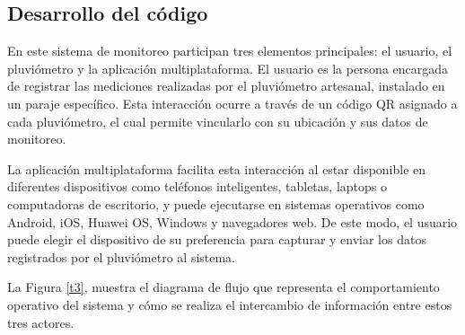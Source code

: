 




































































\subsection{Desarrollo del código}

En este sistema de monitoreo participan tres elementos principales: el usuario, el pluviómetro y la aplicación multiplataforma. El usuario es la persona encargada de registrar las mediciones realizadas por el pluviómetro artesanal, instalado en un paraje específico. Esta interacción ocurre a través de un código QR asignado a cada pluviómetro, el cual permite vincularlo con su ubicación y sus datos de monitoreo.

La aplicación multiplataforma facilita esta interacción al estar disponible en diferentes dispositivos como teléfonos inteligentes, tabletas, laptops o computadoras de escritorio, y puede ejecutarse en sistemas operativos como Android, iOS, Huawei OS, Windows y navegadores web. De este modo, el usuario puede elegir el dispositivo de su preferencia para capturar y enviar los datos registrados por el pluviómetro al sistema.

La Figura \ref{t3}, muestra el diagrama de flujo que representa el comportamiento operativo del sistema y cómo se realiza el intercambio de información entre estos tres actores.

